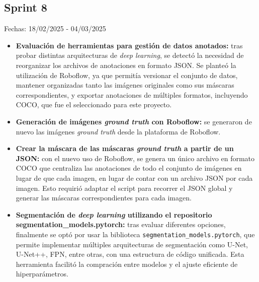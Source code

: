 \subsection{Sprint 8}
Fechas: 18/02/2025 - 04/03/2025
\begin{itemize}
    \item \textbf{Evaluación de herramientas para gestión de datos anotados:} tras probar distintas arquitecturas de \textit{deep learning}, se detectó la necesidad de reorganizar los archivos de anotaciones en formato JSON. Se planteó la utilización de Roboflow, ya que permitía versionar el conjunto de datos, mantener organizadas tanto las imágenes originales como sus máscaras correspondientes, y exportar anotaciones de múltiples formatos, incluyendo COCO, que fue el seleccionado para este proyecto.
    \item \textbf{Generación de imágenes \textit{ground truth} con Roboflow:} se generaron de nuevo las imágenes \textit{ground truth} desde la plataforma de Roboflow.
    \item \textbf{Crear la máscara de las máscaras \textit{ground truth} a partir de un JSON:} con el nuevo uso de Roboflow, se genera un único archivo en formato COCO que centraliza las anotaciones de todo el conjunto de imágenes en lugar de que cada imagen, en lugar de contar con un archivo JSON por cada imagen. Esto requirió adaptar el script para recorrer el JSON global y generar las máscaras correspondientes para cada imagen.
    \item \textbf{Segmentación de \textit{deep learning} utilizando el repositorio segmentation\_models.pytorch:} tras evaluar diferentes opciones, finalmente se optó por usar la biblioteca \texttt{segmentation\_models.pytorch}, que permite implementar múltiples arquitecturas de segmentación como U-Net, U-Net++, FPN, entre otras, con una estructura de código unificada. Esta herramienta facilitó la compración entre modelos y el ajuste eficiente de hiperparámetros.
\end{itemize}
    
